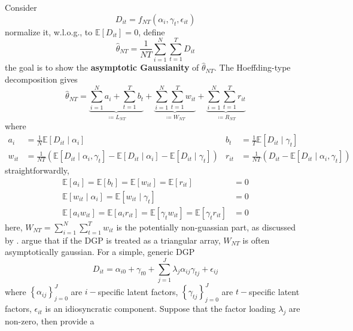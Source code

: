 \documentclass[twoside]{article}
\begin{document}
Consider
$$
D_{it} = f_{NT}\left(\alpha_i,\gamma_t,\epsilon_{it}\right)
$$
normalize it, w.l.o.g., to $\mathbb{E}\left[D_{it}\right]=0$, define 
$$
\hat{\theta}_{NT} = \frac{1}{NT} \sum^N_{i=1}\sum^T_{t=1}D_{it}
$$
the goal is to show the \textbf{asymptotic Gaussianity} of $\hat{\theta}_{NT}$. The Hoeffding-type decomposition gives 
\begin{equation*}
    \hat{\theta}_{NT} = \underbrace{\sum^N_{i=1}a_i + \sum^T_{t=1}b_t}_{\coloneq L_{NT}} + \underbrace{\sum^N_{i=1}\sum^T_{t=1}w_{it}}_{\coloneq W_{NT}} + \underbrace{\sum^N_{i=1}\sum^T_{t=1}r_{it}}_{\coloneq R_{NT}}
\end{equation*}
where 
\begin{align*}
    a_i &= \frac{1}{N}\mathbb{E}\left[D_{it}\mid \alpha_i\right] & b_t &= \frac{1}{T}\mathbb{E}\left[D_{it}\mid \gamma_t\right] \\
    w_{it} &= \frac{1}{NT}\left(\mathbb{E}\left[D_{it}\mid \alpha_i,\gamma_t\right]-\mathbb{E}\left[D_{it}\mid \alpha_i\right] - \mathbb{E}\left[D_{it}\mid \gamma_t\right]\right) & r_{it} &=\frac{1}{NT}\left(D_{it}-\mathbb{E}\left[D_{it}\mid \alpha_i,\gamma_t\right]\right)
\end{align*}
straightforwardly,
\begin{align*}
    \mathbb{E}\left[a_i\right]=\mathbb{E}\left[b_t\right] = \mathbb{E}\left[w_{it}\right] = \mathbb{E}\left[r_{it}\right]&=0\\
    \mathbb{E}\left[w_{it}\mid \alpha_i\right] = \mathbb{E}\left[w_{it}\mid \gamma_t\right] &=0 \\
    \mathbb{E}\left[a_iw_{it}\right] = \mathbb{E}\left[a_ir_{it}\right] = \mathbb{E}\left[\gamma_tw_{it}\right] = \mathbb{E}\left[\gamma_t r_{it}\right] &=0
\end{align*}
here, $W_{NT}=\sum^N_{i=1}\sum^T_{t=1}w_{it}$ is the potentially non-guassian part, as discussed by \citet{menzel2021bootstrap}. \citet{chiang2023using} argue that if the DGP is treated as a triangular array, $W_{NT}$ is often asymptotically gaussian. For a simple, generic DGP
\begin{equation*}
    D_{it} = \alpha_{i0} + \gamma_{t0} + \sum^J_{j=1}\lambda_j \alpha_{ij} \gamma_{tj} + \epsilon_{ij}
\end{equation*}
where $\left\{\alpha_{ij}\right\}^J_{j=0}$ are $i-$specific latent factors, $\left\{\gamma_{tj}\right\}^J_{j=0}$ are $t-$specific latent factors, $\epsilon_{it}$ is an idiosyncratic component. Suppose that the factor loading $\lambda_j$ are non-zero, then \citet{chiang2023using} provide a 
\end{document}
